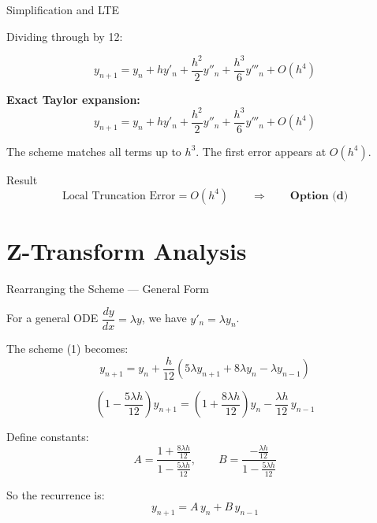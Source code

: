 \documentclass{beamer}
\begin{document}
\begin{frame}{Simplification and LTE}

Dividing through by 12:

\begin{equation}
    y_{n+1} = y_n + h y'_n + \frac{h^2}{2}y''_n + \frac{h^3}{6}y'''_n + O(h^4)
\end{equation}

\vspace{0.2cm}
\textbf{Exact Taylor expansion:}
\begin{equation}
    y_{n+1} = y_n + h y'_n + \frac{h^2}{2}y''_n + \frac{h^3}{6}y'''_n + O(h^4)
\end{equation}

\vspace{0.2cm}
The scheme matches all terms up to $h^3$. The first error appears at $O(h^4)$.

\begin{alertblock}{Result}
\[
    \text{Local Truncation Error} = O(h^4)
    \qquad \Rightarrow \qquad \textbf{Option (d)}
\]
\end{alertblock}

\end{frame}

\section{Z-Transform Analysis}

\begin{frame}{Rearranging the Scheme — General Form}

For a general ODE $\dfrac{dy}{dx} = \lambda y$, we have $y'_n = \lambda y_n$.

\vspace{0.3cm}
The scheme (1) becomes:
\[
    y_{n+1} = y_n + \frac{h}{12}\!\left(5\lambda y_{n+1} + 8\lambda y_n - \lambda y_{n-1}\right)
\]

\begin{equation}
    \left(1 - \frac{5\lambda h}{12}\right)y_{n+1} = \left(1 + \frac{8\lambda h}{12}\right)y_n - \frac{\lambda h}{12}\,y_{n-1}
\end{equation}

\vspace{0.2cm}
Define constants:
\begin{equation}
    A = \frac{1 + \tfrac{8\lambda h}{12}}{1 - \tfrac{5\lambda h}{12}}, \qquad
    B = \frac{-\tfrac{\lambda h}{12}}{1 - \tfrac{5\lambda h}{12}}
\end{equation}

So the recurrence is:
\begin{equation}
    y_{n+1} = A\,y_n + B\,y_{n-1}
\end{equation}

\end{frame}
\end{document}
